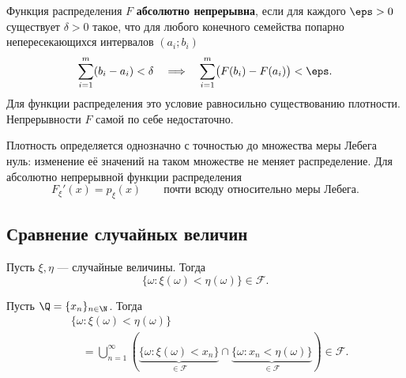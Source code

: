 \begin{definition}
    Функция распределения $F$ \textbf{абсолютно непрерывна}, если
    для каждого $\eps>0$ существует $\delta>0$ такое, что для любого
    конечного семейства попарно непересекающихся интервалов $(a_i;b_i)$
    \[
        \sum_{i=1}^{m}(b_i-a_i)<\delta
        \quad\Longrightarrow\quad
        \sum_{i=1}^{m}\bigl(F(b_i)-F(a_i)\bigr)<\eps.
    \]
    Для функции распределения это условие равносильно существованию
    плотности. Непрерывности $F$ самой по себе недостаточно.
\end{definition}

\begin{remark}
    Плотность определяется однозначно с точностью до множества
    меры Лебега нуль: изменение её значений на таком множестве
    не меняет распределение. Для абсолютно непрерывной функции распределения
    \[
        F_\xi'(x)=p_\xi(x)
        \qquad\text{почти всюду относительно меры Лебега}.
    \]
\end{remark}

\subsection{Сравнение случайных величин}

\begin{exercise}
    Пусть $\xi,\eta$ --- случайные величины. Тогда
    \[
        \{\omega\colon\xi(\omega)<\eta(\omega)\}\in\mathcal{F}.
    \]
\end{exercise}

\begin{solution}
    Пусть $\Q=\{x_n\}_{n\in\N}$. Тогда
    \[
        \begin{aligned}
            &\{\omega\colon\xi(\omega)<\eta(\omega)\}\\
            &\quad=\bigcup_{n=1}^{\infty}
            \left(\underbrace{\{\omega\colon\xi(\omega)<x_n\}}
            _{\in\mathcal{F}}\cap
            \underbrace{\{\omega\colon x_n<\eta(\omega)\}}
            _{\in\mathcal{F}}\right)\in\mathcal{F}.
        \end{aligned}
    \]
\end{solution}
